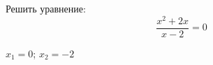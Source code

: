 \begin{ex}
	Решить уравнение:
	$$ \dfrac{x^2+2x}{x-2}=0 $$
	\begin{answer}
		$x_1=0$; $x_2=-2$
	\end{answer}
\end{ex}